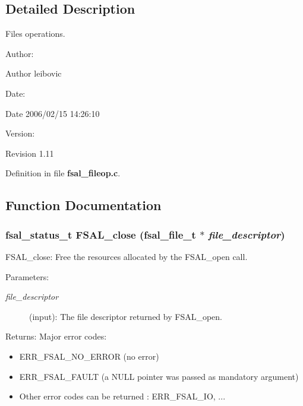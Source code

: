 \subsection{Detailed Description}
Files operations. 

\begin{Desc}
\item[Author:]\begin{Desc}
\item[Author]leibovic \end{Desc}
\end{Desc}
\begin{Desc}
\item[Date:]\begin{Desc}
\item[Date]2006/02/15 14:26:10 \end{Desc}
\end{Desc}
\begin{Desc}
\item[Version:]\begin{Desc}
\item[Revision]1.11 \end{Desc}
\end{Desc}


Definition in file {\bf fsal\_\-fileop.c}.

\subsection{Function Documentation}
\subsubsection{\setlength{\rightskip}{0pt plus 5cm}fsal\_\-status\_\-t FSAL\_\-close (fsal\_\-file\_\-t $\ast$ {\em file\_\-descriptor})}\label{fsal__fileop_8c_a4}


FSAL\_\-close: Free the resources allocated by the FSAL\_\-open call.

\begin{Desc}
\item[Parameters:]
\begin{description}
\item[{\em file\_\-descriptor}](input): The file descriptor returned by FSAL\_\-open.\end{description}
\end{Desc}
\begin{Desc}
\item[Returns:]Major error codes:\begin{itemize}
\item ERR\_\-FSAL\_\-NO\_\-ERROR (no error)\item ERR\_\-FSAL\_\-FAULT (a NULL pointer was passed as mandatory argument)\item Other error codes can be returned : ERR\_\-FSAL\_\-IO, ... \end{itemize}
\end{Desc}


